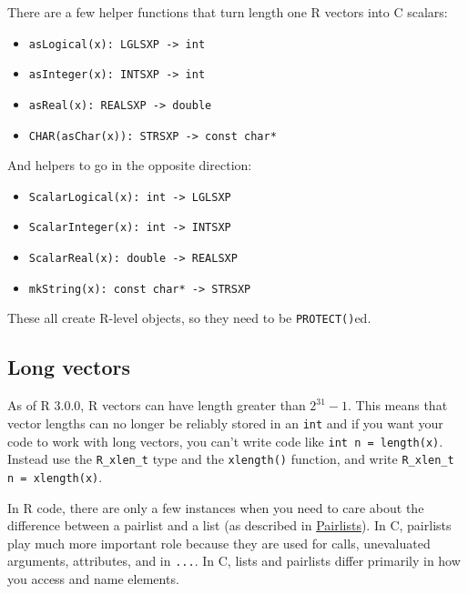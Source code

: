 There are a few helper functions that turn length one R vectors into C
scalars:

\begin{itemize}
\itemsep1pt\parskip0pt
\item
  \texttt{asLogical(x): LGLSXP -\textgreater{} int}
\item
  \texttt{asInteger(x): INTSXP -\textgreater{} int}
\item
  \texttt{asReal(x): REALSXP -\textgreater{} double}
\item
  \texttt{CHAR(asChar(x)): STRSXP -\textgreater{} const char*}
\end{itemize}

And helpers to go in the opposite direction:

\begin{itemize}
\itemsep1pt\parskip0pt
\item
  \texttt{ScalarLogical(x): int -\textgreater{} LGLSXP}
\item
  \texttt{ScalarInteger(x): int -\textgreater{} INTSXP}
\item
  \texttt{ScalarReal(x): double -\textgreater{} REALSXP}
\item
  \texttt{mkString(x): const char* -\textgreater{} STRSXP}
\end{itemize}

These all create R-level objects, so they need to be
\texttt{PROTECT()}ed.

\subsection{Long vectors}

As of R 3.0.0, R vectors can have length greater than \(2 ^ 31 - 1\).
This means that vector lengths can no longer be reliably stored in an
\texttt{int} and if you want your code to work with long vectors, you
can't write code like \texttt{int n = length(x)}. Instead use the
\texttt{R\_xlen\_t} type and the \texttt{xlength()} function, and write
\texttt{R\_xlen\_t n = xlength(x)}. 


In R code, there are only a few instances when you need to care about
the difference between a pairlist and a list (as described in
\hyperref[pairlists]{Pairlists}). In C, pairlists play much more
important role because they are used for calls, unevaluated arguments,
attributes, and in \texttt{...}. In C, lists and pairlists differ
primarily in how you access and name elements. 

